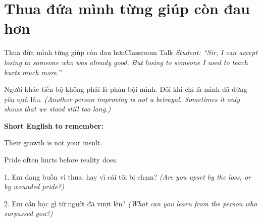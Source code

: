 \section{Thua đứa mình từng giúp còn đau hơn}
\begin{truyen}{Thua đứa mình từng giúp còn đau hơn}{Classroom Talk}
\textit{Student: ``Sir, I can accept losing to someone who was already good. But losing to someone I used to teach hurts much more.''}\\[4pt]



\end{truyen}

\begin{baihoc}
Người khác tiến bộ không phải là phản bội mình. Đôi khi chỉ là mình đã đứng yên quá lâu.
\textit{(Another person improving is not a betrayal. Sometimes it only shows that we stood still too long.)}
\end{baihoc}

\begin{ghinhoanh}
\textbf{Short English to remember:}

Their growth is not your insult.

Pride often hurts before reality does.
\end{ghinhoanh}

\begin{tuhocnhanh}
1. Em đang buồn vì thua, hay vì cái tôi bị chạm? \textit{(Are you upset by the loss, or by wounded pride?)}

2. Em cần học gì từ người đã vượt lên? \textit{(What can you learn from the person who surpassed you?)}
\end{tuhocnhanh}
\ngancach

